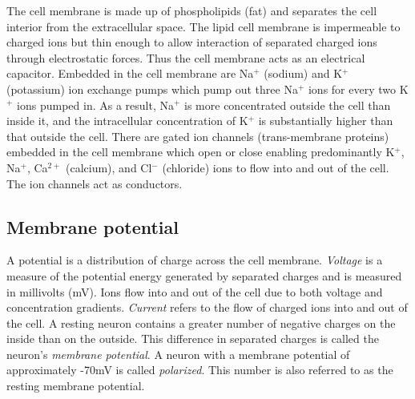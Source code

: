 The cell membrane is made up of phospholipids (fat) and separates the cell interior from the extracellular space. The lipid cell membrane is impermeable
to charged ions but thin enough to allow interaction of separated charged
ions through electrostatic forces. Thus the cell membrane acts as an electrical
capacitor. Embedded in the cell membrane are Na$^{+}$ (sodium) and K$^{+}$ (potassium) ion exchange pumps which pump out three Na$^{+}$ ions for every two K$^{+}$ ions pumped in. As a result, Na$^{+}$ is more concentrated outside the cell than inside it, and the intracellular concentration of K$^{+}$ is substantially higher than that outside the cell. There are gated ion channels
(trans-membrane proteins) embedded in the cell membrane which open or close enabling predominantly K$^{+}$, Na$^{+}$, Ca$^{2+}$ (calcium), and Cl$^{-}$ (chloride) ions to flow into and out of the cell. The ion channels act as conductors.

\subsection{Membrane potential}
A potential is a distribution of charge across the cell membrane.
\textit{Voltage} is a measure of the potential energy generated by separated charges and is measured in millivolts (mV). Ions flow into and out of the cell due to both voltage and concentration gradients. \textit{Current} refers to the flow of charged ions into and out of the cell. A resting neuron contains a greater number of negative charges on the inside than on the outside. 
This difference in separated charges is called the neuron's \textit{membrane potential}. A neuron with a membrane potential of approximately -70mV is called \textit{polarized}. This number is also referred to as the resting membrane potential.  

